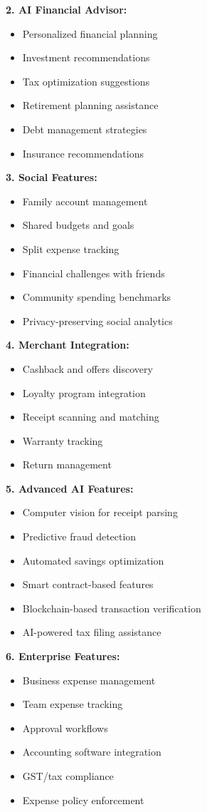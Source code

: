 \documentclass[11pt,a4paper]{report}
\begin{document}
\begin{itemize}
\textbf{2. AI Financial Advisor:}
\begin{itemize}
    \item Personalized financial planning
    \item Investment recommendations
    \item Tax optimization suggestions
    \item Retirement planning assistance
    \item Debt management strategies
    \item Insurance recommendations
\end{itemize}

\textbf{3. Social Features:}
\begin{itemize}
    \item Family account management
    \item Shared budgets and goals
    \item Split expense tracking
    \item Financial challenges with friends
    \item Community spending benchmarks
    \item Privacy-preserving social analytics
\end{itemize}

\textbf{4. Merchant Integration:}
\begin{itemize}
    \item Cashback and offers discovery
    \item Loyalty program integration
    \item Receipt scanning and matching
    \item Warranty tracking
    \item Return management
\end{itemize}

\textbf{5. Advanced AI Features:}
\begin{itemize}
    \item Computer vision for receipt parsing
    \item Predictive fraud detection
    \item Automated savings optimization
    \item Smart contract-based features
    \item Blockchain-based transaction verification
    \item AI-powered tax filing assistance
\end{itemize}

\textbf{6. Enterprise Features:}
\begin{itemize}
    \item Business expense management
    \item Team expense tracking
    \item Approval workflows
    \item Accounting software integration
    \item GST/tax compliance
    \item Expense policy enforcement
\end{itemize}


\end{itemize}
\end{document}
